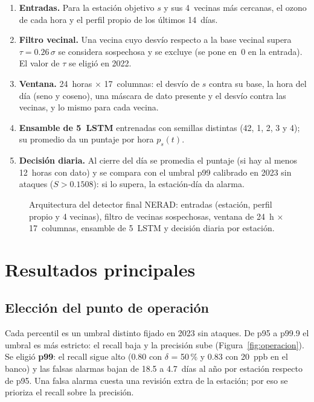 \documentclass[11pt, letterpaper]{article}
\newcommand{\figurapresentacion}[1]{%
  \adjustbox{max width=\linewidth}{}}
\begin{document}
\begin{enumerate}
  \item \textbf{Entradas.} Para la estación objetivo $s$ y sus 4~vecinas más cercanas, el
    ozono de cada hora y el perfil propio de los últimos 14~días.
  \item \textbf{Filtro vecinal.} Una vecina cuyo desvío respecto a la base vecinal supera
    $\tau = 0.26\,\sigma$ se considera sospechosa y se excluye (se pone en~0 en la entrada).
    El valor de $\tau$ se eligió en 2022.
  \item \textbf{Ventana.} 24~horas $\times$ 17~columnas: el desvío de $s$ contra su base,
    la hora del día (seno y coseno), una máscara de dato presente y el desvío contra las
    vecinas, y lo mismo para cada vecina.
  \item \textbf{Ensamble de 5~LSTM} entrenadas con semillas distintas (42, 1, 2, 3 y 4); su
    promedio da un puntaje por hora $p_s(t)$.
  \item \textbf{Decisión diaria.} Al cierre del día se promedia el puntaje (si hay al menos
    12~horas con dato) y se compara con el umbral p99 calibrado en 2023 sin ataques
    ($S > 0.1508$): si lo supera, la estación-día da alarma.
\end{enumerate}

\begin{figure}[H]
  \centering
  \figurapresentacion{arquitectura}
  \caption{Arquitectura del detector final NERAD: entradas (estación, perfil propio y 4
    vecinas), filtro de vecinas sospechosas, ventana de 24~h $\times$ 17~columnas,
    ensamble de 5~LSTM y decisión diaria por estación.}
  \label{fig:arquitectura}
\end{figure}

\section{Resultados principales}
\label{sec:resultados}

\subsection{Elección del punto de operación}

Cada percentil es un umbral distinto fijado en 2023 sin ataques. De p95 a p99.9 el umbral
es más estricto: el recall baja y la precisión sube (Figura~\ref{fig:operacion}). Se
eligió \textbf{p99}: el recall sigue alto (0.80 con $\delta$ = 50\,\% y 0.83 con 20~ppb
en el banco) y las falsas alarmas bajan de 18.5 a 4.7~días al año por estación respecto
de p95. Una falsa alarma cuesta una revisión extra de la estación; por eso se prioriza el
recall sobre la precisión.
\end{document}
